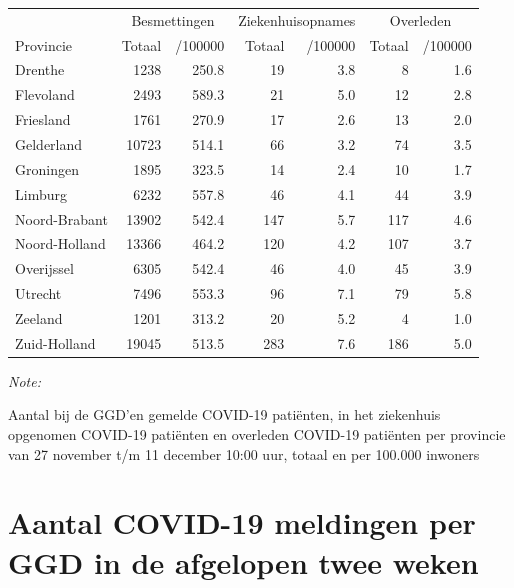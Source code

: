 \documentclass[
  english,
  man,floatsintext]{apa6}
\begin{document}
\begin{table}[H]
\centering
\begin{threeparttable}
\begin{tabular}{lrrrrrr}
\toprule
\multicolumn{1}{c}{ } & \multicolumn{2}{c}{Besmettingen} & \multicolumn{2}{c}{Ziekenhuisopnames} & \multicolumn{2}{c}{Overleden} \\
\cmidrule(l{3pt}r{3pt}){2-3} \cmidrule(l{3pt}r{3pt}){4-5} \cmidrule(l{3pt}r{3pt}){6-7}
Provincie & Totaal & /100000 & Totaal & /100000 & Totaal & /100000\\
\midrule
Drenthe & 1238 & 250.8 & 19 & 3.8 & 8 & 1.6\\
Flevoland & 2493 & 589.3 & 21 & 5.0 & 12 & 2.8\\
Friesland & 1761 & 270.9 & 17 & 2.6 & 13 & 2.0\\
Gelderland & 10723 & 514.1 & 66 & 3.2 & 74 & 3.5\\
Groningen & 1895 & 323.5 & 14 & 2.4 & 10 & 1.7\\
Limburg & 6232 & 557.8 & 46 & 4.1 & 44 & 3.9\\
Noord-Brabant & 13902 & 542.4 & 147 & 5.7 & 117 & 4.6\\
Noord-Holland & 13366 & 464.2 & 120 & 4.2 & 107 & 3.7\\
Overijssel & 6305 & 542.4 & 46 & 4.0 & 45 & 3.9\\
Utrecht & 7496 & 553.3 & 96 & 7.1 & 79 & 5.8\\
Zeeland & 1201 & 313.2 & 20 & 5.2 & 4 & 1.0\\
Zuid-Holland & 19045 & 513.5 & 283 & 7.6 & 186 & 5.0\\
\bottomrule
\end{tabular}
\begin{tablenotes}
\item \textit{Note: } 
\item Aantal bij de GGD’en gemelde COVID-19 patiënten, in het ziekenhuis opgenomen COVID-19 patiënten en overleden COVID-19 patiënten per provincie van 27 november t/m 11 december 10:00 uur, totaal en per 100.000 inwoners
\end{tablenotes}
\end{threeparttable}
\end{table}

\newpage

\hypertarget{aantal-covid-19-meldingen-per-ggd-in-de-afgelopen-twee-weken}{%
\section{Aantal COVID-19 meldingen per GGD in de afgelopen twee weken}\label{aantal-covid-19-meldingen-per-ggd-in-de-afgelopen-twee-weken}}
\end{document}
